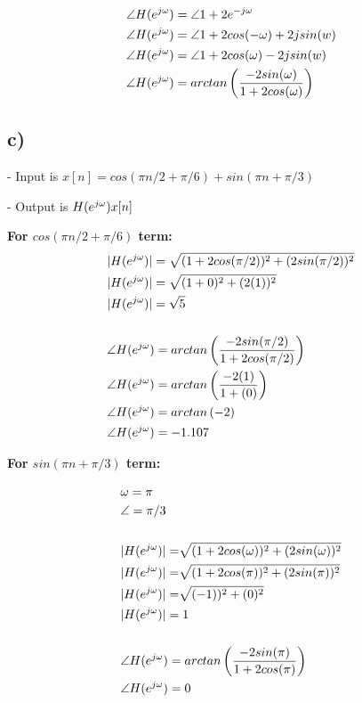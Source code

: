 \documentclass[11pt, fleqn]{article}
\begin{document}
\begin{align*}
    &\angle H(e^{j\omega}) = \angle 1 + 2e^{-j\omega} \\
    &\angle H(e^{j\omega}) = \angle 1 + 2cos(-\omega) + 2jsin(\-w) \\
    &\angle H(e^{j\omega}) = \angle 1 + 2cos(\omega) - 2jsin(w) \\
    &\angle H(e^{j\omega}) = arctan \left( \frac{-2sin(\omega)}{1 + 2cos(\omega)} \right) \\
\end{align*}

\subsection*{c)}

- Input is $x[n] = cos(\pi n/2 + \pi/6) + sin(\pi n + \pi / 3)$

- Output is $H(e^{j\omega})x[n]$

\vspace*{2mm}


\vspace*{1mm}

\textbf{For $cos(\pi n/2 + \pi/6)$ term:}
\begin{align*}
    &|\dtfreqresp|  = \sqrt{(1 + 2cos(\pi/2))^2 + (2sin(\pi/2))^2} \\
    &|\dtfreqresp|  = \sqrt{(1 + 0)^2 + (2(1))^2} \\
    &|\dtfreqresp|  = \sqrt{5} \\
    &\vspace*{1mm} \\
    &\angle \dtfreqresp = arctan \left( \frac{-2sin(\pi/2)}{1 + 2cos(\pi/2)} \right) \\
    &\angle \dtfreqresp = arctan \brround{\frac{-2(1)}{1 + (0)}} \\
    &\angle \dtfreqresp = arctan \brround{-2} \\
    &\angle \dtfreqresp = -1.107
\end{align*}

\vspace*{1mm}

\textbf{For $sin(\pi n + \pi / 3)$ term:}

\begin{align*}
    &\w = \pi \\
    &\angle = \pi/3 \\
    &\vspace{1mm} \\
    &|\dtfreqresp|  =\sqrt[]{(1 + 2cos(\w))^2 + (2sin(\w))^2} \\
    &|\dtfreqresp|  =\sqrt[]{(1 + 2cos(\pi))^2 + (2sin(\pi))^2} \\
    &|\dtfreqresp|  =\sqrt[]{(-1))^2 + (0)^2} \\
    &|\dtfreqresp|  = 1 \\
    &\vspace*{1mm} \\
    &\angle \dtfreqresp = arctan \left( \frac{-2sin(\pi)}{1 + 2cos(\pi)} \right) \\
    &\angle \dtfreqresp = 0 \\
\end{align*}
\end{document}

